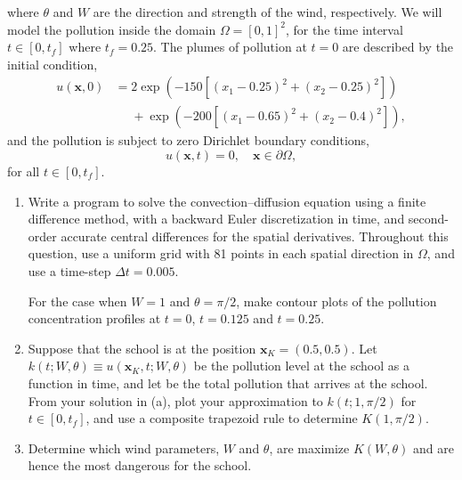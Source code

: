 \documentclass[11pt]{article}
\newcommand{\p}{\partial}
\renewcommand{\vec}[1]{\mathbf{#1}}
\newcommand{\vx}{\vec{x}}
\begin{document}
\begin{enumerate}
\begin{equation}
    \end{equation}
    where $\theta$ and $W$ are the direction and strength of the wind,
    respectively. We will model the pollution inside the domain $\Omega =
    [0,1]^2$, for the time interval $t \in [0,t_f]$ where $t_f=0.25$. The
    plumes of pollution at $t=0$ are described by the initial condition,
    \begin{align}
      u(\vx,0) &= 2\exp\left( -150[ (x_1-0.25)^2 + (x_2 - 0.25)^2]\right) \nonumber \\
      &\phantom{=} + \exp\left( -200[ (x_1-0.65)^2 + (x_2 - 0.4)^2]\right),
    \end{align}
    and the pollution is subject to zero Dirichlet boundary conditions,
    \begin{equation}
      u(\vx,t) = 0, \quad \vx \in \p \Omega,
    \end{equation}
    for all $t \in [0,t_f]$.
    \begin{enumerate}
      \item Write a program to solve the convection--diffusion equation using a
	finite difference method, with a backward Euler discretization in time,
	and second-order accurate central differences for the spatial
	derivatives. Throughout this question, use a uniform grid with 81
	points in each spatial direction in $\Omega$, and use a time-step
	$\Delta t = 0.005$.

	For the case when $W=1$ and $\theta=\pi/2$, make contour plots of the
	pollution concentration profiles at $t=0$, $t=0.125$ and $t=0.25$.
      \item Suppose that the school is at the position $\vec{x}_K = (0.5,0.5)$.
	Let $k(t;W,\theta) \equiv u(\vec{x}_K,t;W,\theta)$ be the pollution
	level at the school as a function in time, and let  be the total pollution that arrives
	at the school. From your solution in (a), plot your approximation to
	$k(t;1,\pi/2)$ for $t \in [0,t_f]$, and use a composite trapezoid rule
	to determine $K(1,\pi/2)$.
      \item Determine which wind parameters, $W$ and $\theta$, are maximize
	$K(W,\theta)$ and are hence the most dangerous for the school.


\end{enumerate}
\end{enumerate}
\end{document}
